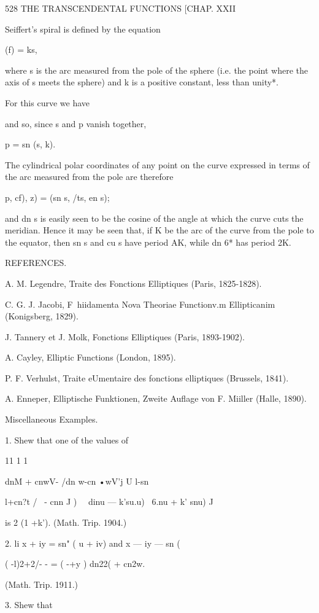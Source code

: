 528 THE TRANSCENDENTAL FUNCTIONS [CHAP. XXII

Seiffert's spiral is defined by the equation

(f) = ks,

where s is the arc measured from the pole of the sphere (i.e. the
point where the axis of s meets the sphere) and k is a positive
constant, less than unity*.

For this curve we have

and so, since s and p vanish together,

p = sn (s, k).

The cylindrical polar coordinates of any point on the curve expressed
in terms of the arc measured from the pole are therefore

 p, cf), z) = (sn s, /ts, en s);

and dn s is easily seen to be the cosine of the angle at which the
curve cuts the meridian. Hence it may be seen that, if K be the arc of
the curve from the pole to the equator, then sn s and cu s have period
AK, while dn 6* has period 2K.

REFERENCES.

A. M. Legendre, Traite des Fonctions Elliptiques (Paris, 1825-1828).

C. G. J. Jacobi, F\ hiidamenta Nova Theoriae Functionv.m Ellipticanim
(Konigsberg, 1829).

J. Tannery et J. Molk, Fonctions Elliptiques (Paris, 1893-1902).

A. Cayley, Elliptic Functions (London, 1895).

P. F. Verhulst, Traite eUmentaire des fonctions elliptiques (Brussels,
1841).

A. Enneper, Elliptische Funktionen, Zweite Auflage von F. Miiller
(Halle, 1890).

Miscellaneous Examples.

1. Shew that one of the values of

11 1 1

dnM + cnwV- /dn w-cn •wV'j U l-sn%

l+cn?t / \ - cnn J ) \ \ dinu — k'su.u) \ 6.nu + k' snu) J

is 2 (1 +k'). (Math. Trip. 1904.)

2. li x + iy = sn" ( u + iv) and x — iy — sn (%

 ( -l)2+2/- - = ( -+y ) dn22( + cn2w.

(Math. Trip. 1911.)

3. Shew that

